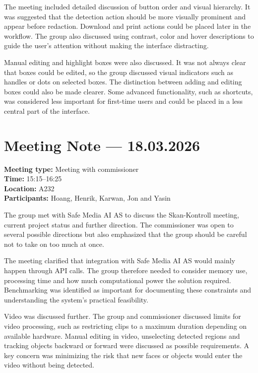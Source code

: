 The meeting included detailed discussion of button order and visual hierarchy. It was suggested that the detection action should be more visually prominent and appear before redaction. Download and print actions could be placed later in the workflow. The group also discussed using contrast, color and hover descriptions to guide the user's attention without making the interface distracting.

Manual editing and highlight boxes were also discussed. It was not always clear that boxes could be edited, so the group discussed visual indicators such as handles or dots on selected boxes. The distinction between adding and editing boxes could also be made clearer. Some advanced functionality, such as shortcuts, was considered less important for first-time users and could be placed in a less central part of the interface.

\section{Meeting Note --- 18.03.2026}
\label{app:meeting-2026-03-18}
\textbf{Meeting type:} Meeting with commissioner\\
\textbf{Time:} 15:15--16:25\\
\textbf{Location:} A232\\
\textbf{Participants:} Hoang, Henrik, Karwan, Jon and Yasin

The group met with Safe Media AI AS to discuss the Skan-Kontroll meeting, current project status and further direction. The commissioner was open to several possible directions but also emphasized that the group should be careful not to take on too much at once.

The meeting clarified that integration with Safe Media AI AS would mainly happen through API calls. The group therefore needed to consider memory use, processing time and how much computational power the solution required. Benchmarking was identified as important for documenting these constraints and understanding the system's practical feasibility.

Video was discussed further. The group and commissioner discussed limits for video processing, such as restricting clips to a maximum duration depending on available hardware. Manual editing in video, unselecting detected regions and tracking objects backward or forward were discussed as possible requirements. A key concern was minimizing the risk that new faces or objects would enter the video without being detected.

